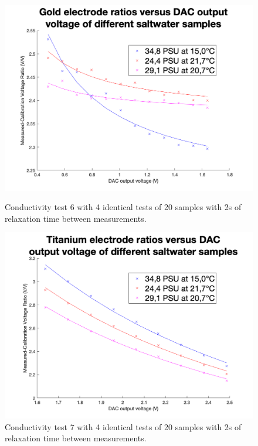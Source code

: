 \begin{figure}[ht]
    \begin{minipage}{0.5\textwidth}
        \centering
        \includegraphics[width=\textwidth]{Figures/Testing/Au_sweep_analysis}
        \caption{Conductivity test 6 with 4 identical tests of 20 samples with 2s of relaxation time between measurements.}
        \label{fig:test15} %
    \end{minipage}
    \begin{minipage}{0.5\textwidth}
        \centering
        \includegraphics[width=\textwidth]{Figures/Testing/Ti_sweep_analysis}
        \caption{Conductivity test 7 with 4 identical tests of 20 samples with 2s of relaxation time between measurements.}
        \label{fig:test16} %
    \end{minipage}
\end{figure}

